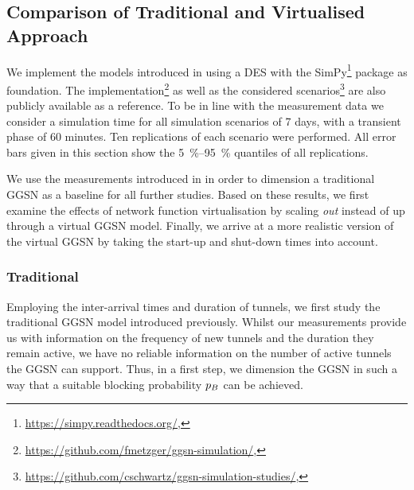 \subsection{Comparison of Traditional and Virtualised Approach}\label{sec:cloud:virtualized_network_functions:performance_evaluation}

We implement the models introduced in  using a \gls{DES} with the SimPy\footnote{\url{https://simpy.readthedocs.org/}, \accessed} package as foundation.
The implementation\footnote{\url{https://github.com/fmetzger/ggsn-simulation/}, \accessed} as well as the considered scenarios\footnote{\url{https://github.com/cschwartz/ggsn-simulation-studies/}, \accessed} are also publicly available as a reference.
To be in line with the measurement data we consider a simulation time for all simulation scenarios of 7 days, with a transient phase of 60 minutes.
Ten replications of each scenario were performed.
All error bars given in this section show the \SIrange{5}{95}{\percent} quantiles of all replications.

We use the measurements introduced in  in order to dimension a traditional \gls{GGSN} as a baseline for all further studies.
Based on these results, we first examine the effects of network function virtualisation by scaling \emph{out} instead of up through a virtual \gls{GGSN} model.
Finally, we arrive at a more realistic version of the virtual \gls{GGSN} by taking the start-up and shut-down times into account.

\subsubsection*{Traditional }\label{sec:cloud:virtualized_network_functions:performance_evaluation:traditional_ggsn}

Employing the inter-arrival times and duration of tunnels, we first study the traditional \gls{GGSN} model introduced previously.
Whilst our measurements provide us with information on the frequency of new tunnels and the duration they remain active, we have no reliable information on the number of active tunnels the \gls{GGSN} can support.
Thus, in a first step, we dimension the \gls{GGSN} in such a way that a suitable blocking probability \(p_B\) can be achieved.


